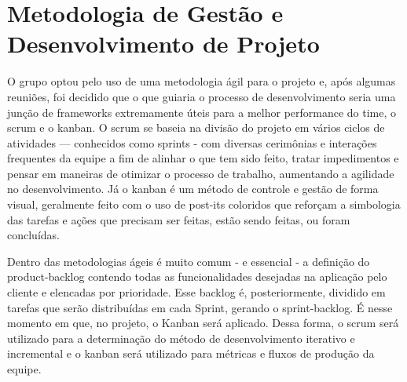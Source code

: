 \section{Metodologia de Gestão e Desenvolvimento de Projeto}
O grupo optou pelo uso de uma metodologia ágil para o projeto e, após
algumas reuniões, foi decidido que o que guiaria o processo de
desenvolvimento seria uma junção de frameworks extremamente úteis para
a melhor performance do time, o \gls{scrum} e o \gls{kanban}.  O \gls{scrum}
se baseia na divisão do projeto em vários ciclos de atividades ---
conhecidos como sprints - com diversas cerimônias e interações
frequentes da equipe a fim de alinhar o que tem sido feito, tratar
impedimentos e pensar em maneiras de otimizar o processo de trabalho,
aumentando a agilidade no desenvolvimento. Já o \gls{kanban} é um
método de controle e gestão de forma visual, geralmente feito com o
uso de post-its coloridos que reforçam a simbologia das tarefas e
ações que precisam ser feitas, estão sendo feitas, ou foram
concluídas.

Dentro das metodologias ágeis é muito comum - e essencial - a
definição do \gls{product-backlog} contendo todas as funcionalidades
desejadas na aplicação pelo cliente e elencadas por prioridade. Esse
backlog é, posteriormente, dividido em tarefas que serão distribuídas
em cada Sprint, gerando o \gls{sprint-backlog}. É nesse momento em que, no
projeto, o Kanban será aplicado. Dessa forma, o \gls{scrum} será utilizado
para a determinação do método de desenvolvimento iterativo e
incremental e o \gls{kanban} será utilizado para métricas e fluxos de
produção da equipe.
